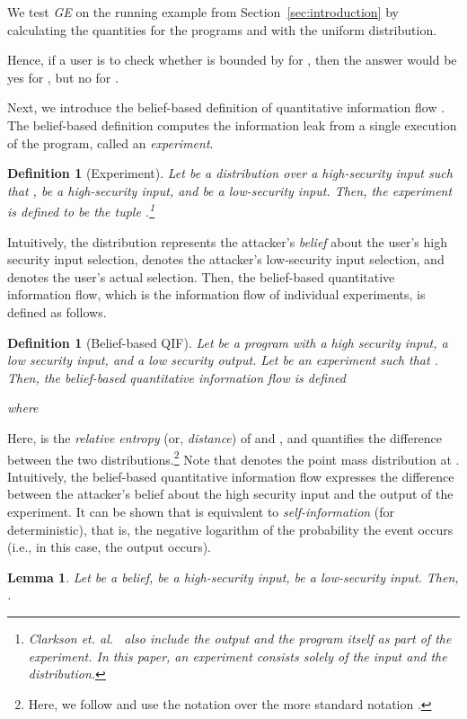 \documentclass{llncs}
\newtheorem{definition}[theorem]{Definition}
\newtheorem{lemma}[theorem]{Lemma}
\begin{document}
We test {\it GE} on the running example from
Section~\ref{sec:introduction} by calculating the quantities for the
programs  and  with the uniform distribution. 
\renewcommand{\arraystretch}{1.1}

\renewcommand{\arraystretch}{1.0}

\noindent
Hence, if a user is to check whether  is bounded by
 for , then the answer would be yes for , but no
for .

Next, we introduce the belief-based definition of quantitative
information flow \cite{clarkson:csf2005}.  The belief-based definition
computes the information leak from a single execution of the program,
called an {\em experiment}.

\begin{definition}[Experiment]
  Let  be a distribution over a high-security input such that
  ,  be a high-security input, and
   be a low-security input.  Then, the experiment
   is defined to be the tuple .\footnote{Clarkson et.
    al.~\cite{clarkson:csf2005} also include the output and the
    program itself as part of the experiment.  In this paper, an
    experiment consists solely of the input and the distribution.}
\end{definition}
Intuitively, the distribution  represents the attacker's {\em belief}
about the user's high security input selection, 
denotes the attacker's low-security input selection, and
 denotes the user's actual selection.  Then, the
belief-based quantitative information flow, which is the information flow
of individual experiments, is defined as follows.
\begin{definition}[Belief-based QIF]
\label{def:beliefqif}
Let  be a program with a high security input, a low security input,
and a low security output.  Let  be an experiment such
that .
Then, the belief-based quantitative information flow is defined

where
\end{definition}
Here,  is the {\em relative entropy}
  (or, {\em distance}) of  and , and quantifies the
difference between the two distributions.\footnote{Here, we
    follow \cite{clarkson:csf2005} and use the notation
     over the more standard notation .}  Note that  denotes the point mass
distribution at .  Intuitively, the belief-based quantitative
information flow expresses the difference between the attacker's
belief about the high security input and the output of the experiment.
It can be shown that  is equivalent to {\em
  self-information} (for  deterministic), that is, the
  negative logarithm of the probability the event occurs (i.e., in
  this case, the output occurs).
\begin{lemma}
  Let  be a belief,  be a high-security input,
   be a low-security input.  Then, .
\label{lem:be}
\end{lemma}
\end{document}
